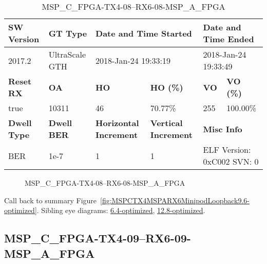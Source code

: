 \begin{table}[h]
\centering
\caption{MSP\_C\_FPGA-TX4-08--RX6-08-MSP\_A\_FPGA}
\label{tab:MSPCFPGATX408RX608MSPAFPGA9.6-optimized}
\begin{tabular}{@{}|l|l|l|l|l|l|@{}}
\toprule
\textbf{SW Version}                & \textbf{GT Type}   & \multicolumn{2}{l|}{\textbf{Date and Time Started}}            & \multicolumn{2}{l|}{\textbf{Date and Time Ended}}        \\ \midrule
2017.2                       & UltraScale GTH          & \multicolumn{2}{l|}{2018-Jan-24 19:33:19}                   & \multicolumn{2}{l|}{2018-Jan-24 19:33:49}               \\ \midrule
\textbf{Reset RX}                  & \textbf{OA} & \textbf{HO}   & \textbf{HO (\%)} & \textbf{VO} & \textbf{VO (\%)} \\ \midrule
true & 10311        & 46          & 70.77\%        & 255        & 100.00\%       \\ \midrule
\textbf{Dwell Type}                & \textbf{Dwell BER} & \textbf{Horizontal Increment} & \textbf{Vertical Increment}    & \multicolumn{2}{l|}{\textbf{Misc Info}}                  \\ \midrule
BER                            & 1e-7        & 1        & 1           & \multicolumn{2}{l|}{ELF Version: 0xC002 SVN: 0}                         \\ \bottomrule
\end{tabular}
\end{table}

\begin{figure}[h]
\caption{MSP\_C\_FPGA-TX4-08--RX6-08-MSP\_A\_FPGA} \label{fig:MSPCFPGATX408RX608MSPAFPGA9.6-optimized}
\end{figure}

Call back to summary Figure~\ref{fig:MSPCTX4MSPARX6MinipodLoopback9.6-optimized}.
Sibling eye diagrams: \hyperref[sec:MSPCFPGATX408RX608MSPAFPGA6.4-optimized]{6.4-optimized}, \hyperref[sec:MSPCFPGATX408RX608MSPAFPGA12.8-optimized]{12.8-optimized}.

\clearpage
\newpage


\subsection{MSP\_C\_FPGA-TX4-09--RX6-09-MSP\_A\_FPGA}\label{sec:MSPCFPGATX409RX609MSPAFPGA9.6-optimized}

